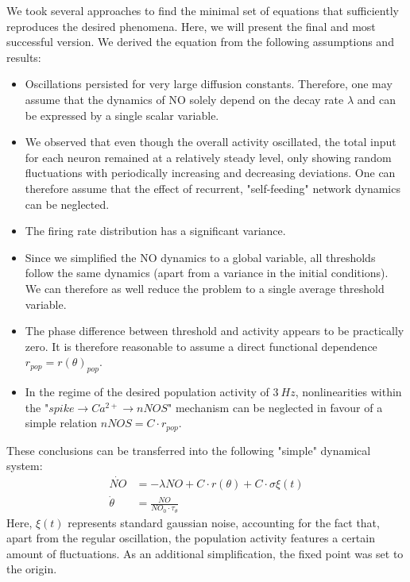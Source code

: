 \documentclass[10pt,a4paper]{article}
\begin{document}
We took several approaches to find the minimal set of equations that sufficiently reproduces the desired phenomena. Here, we will present the final and most successful version. We derived the equation from the following assumptions and results:

\begin{itemize}
\item Oscillations persisted for very large diffusion constants. Therefore, one may assume that the dynamics of NO solely depend on the decay rate $\lambda$ and can be expressed by a single scalar variable.
\item We observed that even though the overall activity oscillated, the total input for each neuron remained at a relatively steady level, only showing random fluctuations with periodically increasing and decreasing deviations. One can therefore assume that the effect of recurrent, "self-feeding" network dynamics can be neglected.
\item The firing rate distribution has a significant variance.
\item Since we simplified the NO dynamics to a global variable, all thresholds follow the same dynamics (apart from a variance in the initial conditions). We can therefore as well reduce the problem to a single average threshold variable.
\item The phase difference between threshold and activity appears to be practically zero. It is therefore reasonable to assume a direct functional dependence $r_{pop}=r(\theta)_{pop}$.
\item In the regime of the desired population activity of $3~Hz$, nonlinearities within the "$spike \rightarrow Ca^{2+} \rightarrow nNOS$" mechanism can be neglected in favour of a simple relation $nNOS = C\cdot r_{pop}$.  
\end{itemize}

These conclusions can be transferred into the following "simple" dynamical system:
\begin{align}
\dot{NO} &= -\lambda NO + C\cdot r(\theta) + C\cdot \sigma \xi(t) \label{simple_NO_dyn}\\ 
\dot{\theta} &= \frac{NO}{NO_0\cdot \tau_{\theta}} \label{simple_threshold_dyn}
\end{align}
Here, $\xi(t)$ represents standard gaussian noise, accounting for the fact that, apart from the regular oscillation, the population activity features a certain amount of fluctuations. As an additional simplification, the fixed point was set to the origin.
\end{document}
